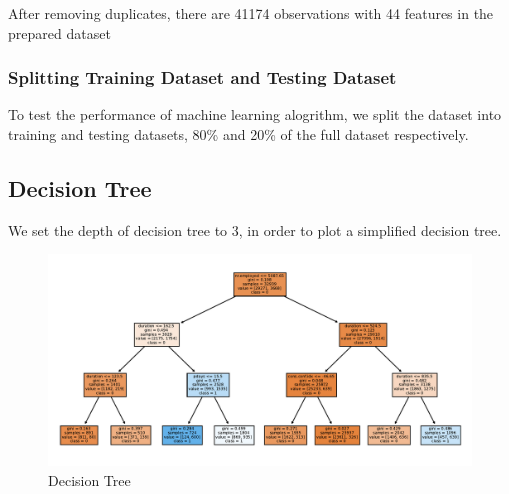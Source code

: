 \documentclass[11pt,a4paper]{article}
\begin{document}
    \noindent
    After removing duplicates, there are 41174 observations with 44 features in the prepared dataset
    
    
    \subsubsection{Splitting Training Dataset and Testing Dataset}
    To test the performance of machine learning alogrithm, we split the dataset into training and testing datasets, 80\% and 20\% of the full dataset respectively.
    
    
    \newpage
    \subsection{Decision Tree} \label{decision_trees}
    We set the depth of decision tree to 3, in order to plot a simplified decision tree.

    \begin{figure}[ht]
        \centering
        \includegraphics[width=\textwidth]{plot/classification/decision_tree.pdf}
        \caption{Decision Tree}
        \label{fig:decision_tree}
    \end{figure}
\end{document}
